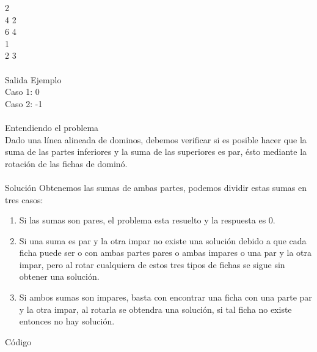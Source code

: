 \documentclass[12pt]{article}
\begin{document}
2\\
4 2\\
6 4\\
1\\
2 3\\
\\
\textrm{\large Salida Ejemplo}
\\
Caso 1: 0\\
Caso 2: -1\\
\\
\textrm{\large Entendiendo el problema}\\
Dado una línea alineada de dominos, debemos verificar si es posible hacer que la suma de las partes inferiores y la suma de las superiores es par, ésto mediante la rotación de las fichas de dominó.\\
\\
\textrm{\large Solución}
Obtenemos las sumas de ambas partes, podemos dividir estas sumas en tres casos:
\begin{enumerate}
\item Si las sumas son pares, el problema esta resuelto y la respuesta es 0.
\item Si una suma es par y la otra impar no existe una solución debido a que cada ficha puede ser o con ambas partes pares o ambas impares o una par y la otra impar, pero al rotar cualquiera de estos tres tipos de fichas se sigue sin obtener una solución.
\item Si ambos sumas son impares, basta con encontrar una ficha con una parte par y la otra impar, al rotarla se obtendra una solución, si tal ficha no existe entonces no hay solución.
\end{enumerate}
\textrm{\large Código}\\
\end{document}
